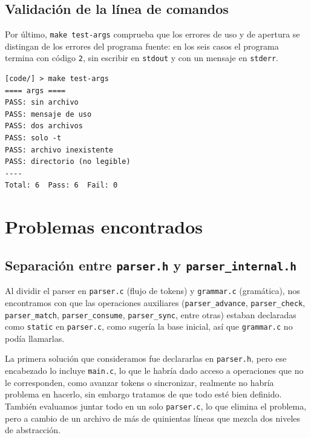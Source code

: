 \documentclass[12pt,letterpaper]{article}
\begin{document}
\subsection*{Validación de la línea de comandos}

Por último, \texttt{make test-args} comprueba que los errores de uso y de apertura se distingan de los
errores del programa fuente: en los seis casos el programa termina con código \texttt{2}, sin escribir en
\texttt{stdout} y con un mensaje en \texttt{stderr}.

\begin{verbatim}
[code/] > make test-args
==== args ====
PASS: sin archivo
PASS: mensaje de uso
PASS: dos archivos
PASS: solo -t
PASS: archivo inexistente
PASS: directorio (no legible)
----
Total: 6  Pass: 6  Fail: 0
\end{verbatim}


\bigskip


\section*{Problemas encontrados}\label{sec:problemas}

\subsection*{Separación entre \texttt{parser.h} y \texttt{parser\_internal.h}}

Al dividir el parser en \texttt{parser.c} (flujo de tokens) y \texttt{grammar.c} (gramática), nos encontramos
con que las operaciones auxiliares (\texttt{parser\_advance}, \texttt{parser\_check}, \texttt{parser\_match},
\texttt{parser\_consume}, \texttt{parser\_sync}, entre otras) estaban declaradas como \texttt{static} en
\texttt{parser.c}, como sugería la base inicial, así que \texttt{grammar.c} no podía llamarlas.

La primera solución que consideramos fue declararlas en \texttt{parser.h}, pero ese encabezado lo incluye
\texttt{main.c}, lo que le habría dado acceso a operaciones que no le corresponden, como avanzar tokens o
sincronizar, realmente no habría problema en hacerlo, sin embargo tratamos de que todo esté bien definido.
También evaluamos juntar todo en un solo \texttt{parser.c}, lo que elimina el problema, pero a
cambio de un archivo de más de quinientas líneas que mezcla dos niveles de abstracción.\\
\end{document}

